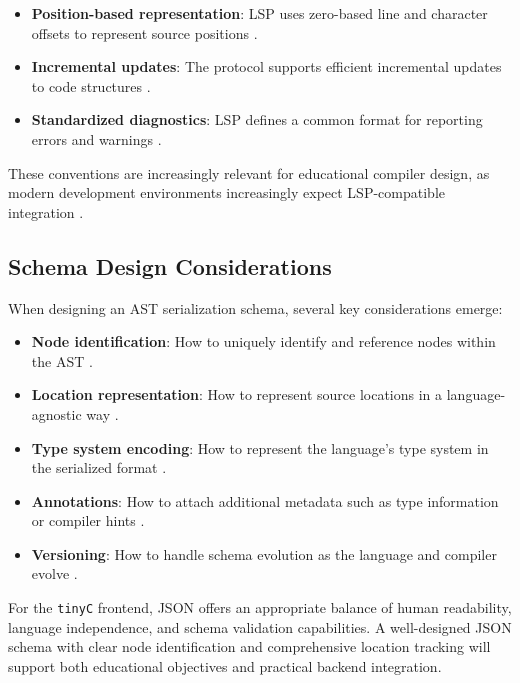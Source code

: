 \begin{itemize}
    \item \textbf{Position-based representation}: LSP uses zero-based line and character offsets to represent source positions \cite{microsoft2016language}.
    \item \textbf{Incremental updates}: The protocol supports efficient incremental updates to code structures \cite{microsoft2016language}.
    \item \textbf{Standardized diagnostics}: LSP defines a common format for reporting errors and warnings \cite{microsoft2016language}.
\end{itemize}

These conventions are increasingly relevant for educational compiler design, as modern development environments increasingly expect LSP-compatible integration \cite{microsoft2016language}.

\subsection{Schema Design Considerations}

When designing an AST serialization schema, several key considerations emerge:

\begin{itemize}
    \item \textbf{Node identification}: How to uniquely identify and reference nodes within the AST \cite{parr2010language}.
    \item \textbf{Location representation}: How to represent source locations in a language-agnostic way \cite{parr2013definitive}.
    \item \textbf{Type system encoding}: How to represent the language's type system in the serialized format \cite{appel2004modern}.
    \item \textbf{Annotations}: How to attach additional metadata such as type information or compiler hints \cite{appel2004modern}.
    \item \textbf{Versioning}: How to handle schema evolution as the language and compiler evolve \cite{varda2008protocol}.
\end{itemize}

For the \texttt{tinyC} frontend, JSON offers an appropriate balance of human readability, language independence, and schema validation capabilities. A well-designed JSON schema with clear node identification and comprehensive location tracking will support both educational objectives and practical backend integration.

